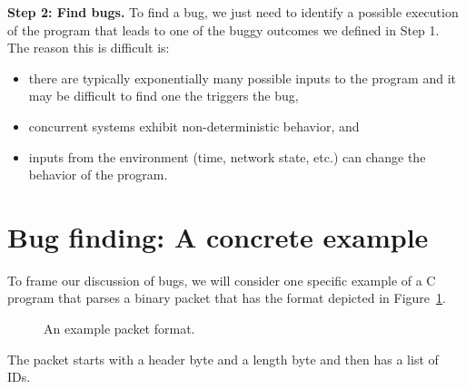 \documentclass[
  letterpaper,
]{scrbook}
\providecommand{\tightlist}{%
  \setlength{\itemsep}{0pt}\setlength{\parskip}{0pt}}
\theoremstyle{definition}
\theoremstyle{plain}
\theoremstyle{plain}
\theoremstyle{remark}
\begin{document}
\textbf{Step 2: Find bugs.} To find a bug, we just need to identify a
possible execution of the program that leads to one of the buggy
outcomes we defined in Step 1. The reason this is difficult is:

\begin{itemize}
\tightlist
\item
  there are typically exponentially many possible inputs to the program
  and it may be difficult to find one the triggers the bug,
\item
  concurrent systems exhibit non-deterministic behavior, and
\item
  inputs from the environment (time, network state, etc.) can change the
  behavior of the program.
\end{itemize}

\section{Bug finding: A concrete
example}\label{bug-finding-a-concrete-example}

To frame our discussion of bugs, we will consider one specific example
of a C program that parses a binary packet that has the format depicted
in Figure~\ref{fig-packet}.

\begin{figure}


\caption{\label{fig-packet}An example packet format.}

\end{figure}%

The packet starts with a header byte and a length byte and then has a
list of IDs.
\end{document}
